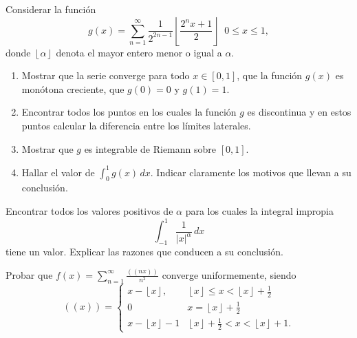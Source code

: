 \documentclass{book}
\begin{document}
\begin{ejer}{} Considerar la función 
\[
g(x)=\sum_{n=1}^{\infty} \frac{1}{2^{2n-1}}\left\lfloor \frac{2^nx+1}{2}\right\rfloor\;\;0\leq x\leq 1,
\]
donde $\left\lfloor\alpha\right\rfloor$ denota el mayor entero menor o igual a $\alpha$.
\\
\begin{enumerate}\item 
Mostrar que la serie converge para todo $x \in [0,1]$, que la función $g(x)$ es monótona creciente, que 
$g(0)=0$ y $g(1)=1$.

\item
Encontrar todos los puntos en los cuales la función $g$ es discontinua y en estos puntos calcular la diferencia
entre los límites laterales.



\item Mostrar que $g$ es integrable de Riemann sobre $[0,1]$.
\item 
Hallar el valor de $\int_0^1 g(x)\,dx.$ %
Indicar claramente los motivos que llevan a su conclusión.
\end{enumerate}
\end{ejer}  

\begin{ejer}{} Encontrar todos los valores positivos de $\alpha$ para los cuales la integral impropia 
\[
\int_{-1}^1 \frac{1}{|x|^{\alpha}}\,dx
\]
tiene un valor. Explicar las razones que conducen a su conclusión.

\end{ejer}  

\begin{ejer}{} Probar que  $f(x)=\sum\limits_{n=1}^{\infty} \frac{((nx))}{n^2}$ converge uniformemente,
siendo
\[
((x))=\left\{
\begin{array}{ll}
x-\left\lfloor x\right\rfloor, &\left\lfloor x\right\rfloor  \leq x < \left\lfloor x\right\rfloor+\frac{1}{2}
\\
0&x=\left\lfloor x\right\rfloor+\frac{1}{2}
\\
x-\left\lfloor x\right\rfloor-1 & \left\lfloor x\right\rfloor+\frac{1}{2} <x< \left\lfloor x\right\rfloor+1.
\end{array}
\right.
\]


\end{ejer} 
\end{document}
